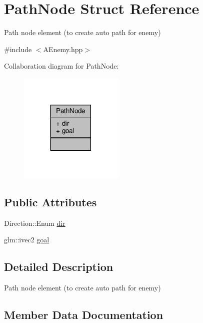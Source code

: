 \hypertarget{struct_path_node}{}\section{Path\+Node Struct Reference}
\label{struct_path_node}


Path node element (to create auto path for enemy)  




{\ttfamily \#include $<$A\+Enemy.\+hpp$>$}



Collaboration diagram for Path\+Node\+:
\nopagebreak
\begin{figure}[H]
\begin{center}
\leavevmode
\includegraphics[width=140pt]{struct_path_node__coll__graph}
\end{center}
\end{figure}
\subsection*{Public Attributes}
\begin{DoxyCompactItemize}
\item 
Direction\+::\+Enum \hyperlink{struct_path_node_aca2add14f4fe6dd052cf4cb238781968}{dir}
\item 
glm\+::ivec2 \hyperlink{struct_path_node_aac57cd4c91aee6058d05f9e4944bb43c}{goal}
\end{DoxyCompactItemize}


\subsection{Detailed Description}
Path node element (to create auto path for enemy) 

\subsection{Member Data Documentation}
\mbox{\label{struct_path_node_aca2add14f4fe6dd052cf4cb238781968}} 
